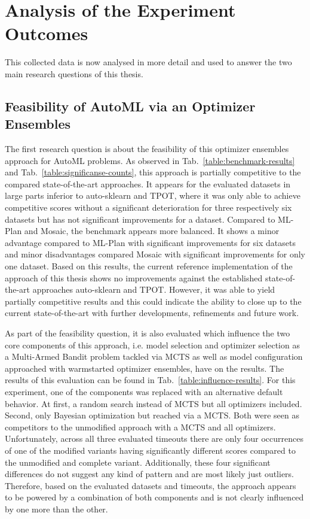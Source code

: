 \section{Analysis of the Experiment Outcomes}
\label{sec:evaluation:analysis}
This collected data is now analysed in more detail and used to answer the two main research questions of this thesis.

\subsection{Feasibility of AutoML via an Optimizer Ensembles}
\label{sec:evaluation:analysis:feasibility}
The first research question is about the feasibility of this optimizer ensembles approach for AutoML problems.\newline
As observed in Tab.~\ref{table:benchmark-results} and Tab.~\ref{table:significanse-counts}, this approach is partially competitive to the compared state-of-the-art approaches.
It appears for the evaluated datasets in large parts inferior to auto-sklearn and TPOT, where it was only able to achieve competitive scores without a significant deterioration for three respectively six datasets but has not significant improvements for a dataset.
Compared to ML-Plan and Mosaic, the benchmark appears more balanced.
It shows a minor advantage compared to ML-Plan with significant improvements for six datasets and minor disadvantages compared Mosaic with significant improvements for only one dataset.\newline
Based on this results, the current reference implementation of the approach of this thesis shows no improvements against the established state-of-the-art approaches auto-sklearn and TPOT.
However, it was able to yield partially competitive results and this could indicate the ability to close up to the current state-of-the-art with further developments, refinements and future work.

As part of the feasibility question, it is also evaluated which influence the two core components of this approach, i.e. model selection and optimizer selection as a Multi-Armed Bandit problem tackled via MCTS as well as model configuration approached with warmstarted optimizer ensembles, have on the results.
The results of this evaluation can be found in Tab.~\ref{table:influence-results}.\newline
For this experiment, one of the components was replaced with an alternative default behavior.
At first, a random search instead of MCTS but all optimizers included.
Second, only Bayesian optimization but reached via a MCTS.
Both were seen as competitors to the unmodified approach with a MCTS and all optimizers.\newline
Unfortunately, across all three evaluated timeouts there are only four occurrences of one of the modified variants having significantly different scores compared to the unmodified and complete variant.
Additionally, these four significant differences do not suggest any kind of pattern and are most likely just outliers.
Therefore, based on the evaluated datasets and timeouts, the approach appears to be powered by a combination of both components and is not clearly influenced by one more than the other.

